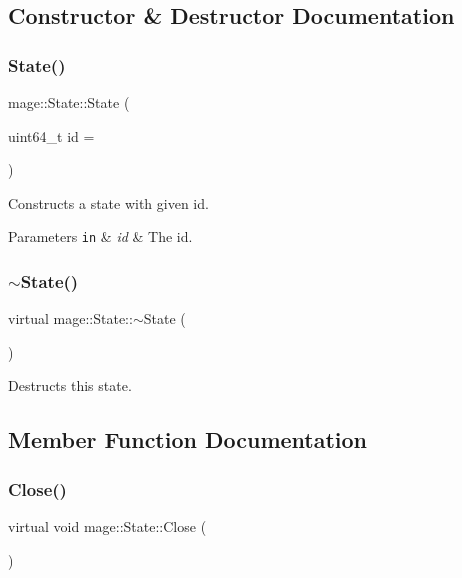 \subsection{Constructor \& Destructor Documentation}
\hypertarget{classmage_1_1_state_ac21bb6de22bb3b9c1b18d98b53e92100}{}\label{classmage_1_1_state_ac21bb6de22bb3b9c1b18d98b53e92100} 
\subsubsection{\texorpdfstring{State()}{State()}}
{\footnotesize\ttfamily mage\+::\+State\+::\+State (\begin{DoxyParamCaption}\item[{uint64\+\_\+t}]{id = {} }\end{DoxyParamCaption})}

Constructs a state with given id.


\begin{DoxyParams}[1]{Parameters}
\mbox{\tt in}  & {\em id} & The id. \\
\hline
\end{DoxyParams}
\hypertarget{classmage_1_1_state_a8e5220ebfb74db1ed95f4d3b3ec8fb2d}{}\label{classmage_1_1_state_a8e5220ebfb74db1ed95f4d3b3ec8fb2d} 
\subsubsection{\texorpdfstring{$\sim$\+State()}{~State()}}
{\footnotesize\ttfamily virtual mage\+::\+State\+::$\sim$\+State (\begin{DoxyParamCaption}{ }\end{DoxyParamCaption})\hspace{0.3cm}{\ttfamily [virtual]}}

Destructs this state. 

\subsection{Member Function Documentation}
\hypertarget{classmage_1_1_state_a1edd5d756566f5b689c7a381f4e6b301}{}\label{classmage_1_1_state_a1edd5d756566f5b689c7a381f4e6b301} 
\subsubsection{\texorpdfstring{Close()}{Close()}}
{\footnotesize\ttfamily virtual void mage\+::\+State\+::\+Close (\begin{DoxyParamCaption}{ }\end{DoxyParamCaption})\hspace{0.3cm}{\ttfamily [virtual]}}

